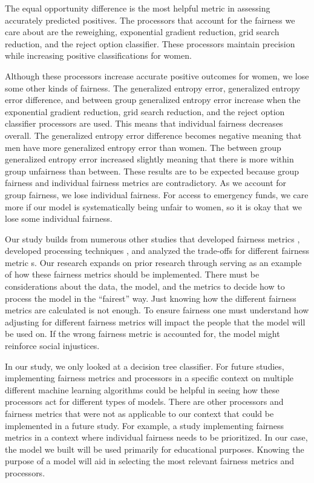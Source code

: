 \documentclass[water,article,submit,moreauthors,pdftex]{mdpi}
\begin{document}
The equal opportunity difference is the most helpful metric in assessing
accurately predicted positives. The processors that account for the
fairness we care about are the reweighing, exponential gradient
reduction, grid search reduction, and the reject option classifier.
These processors maintain precision while increasing positive
classifications for women.

Although these processors increase accurate positive outcomes for women,
we lose some other kinds of fairness. The generalized entropy error,
generalized entropy error difference, and between group generalized
entropy error increase when the exponential gradient reduction, grid
search reduction, and the reject option classifier processors are used.
This means that individual fairness decreases overall. The generalized
entropy error difference becomes negative meaning that men have more
generalized entropy error than women. The between group generalized
entropy error increased slightly meaning that there is more within group
unfairness than between. These results are to be expected because group
fairness and individual fairness metrics are contradictory. As we
account for group fairness, we lose individual fairness. For access to
emergency funds, we care more if our model is systematically being
unfair to women, so it is okay that we lose some individual fairness.

Our study builds from numerous other studies that developed fairness
metrics \citep{speicher2018unified, wachter2021fairness}, developed
processing techniques
\citep{agarwal2018reductions, kamiran2012data, agarwal2019fair, pleiss2017fairness},
and analyzed the trade-offs for different fairness metric
s\citep{speicher2018unified}. Our research expands on prior research
through serving as an example of how these fairness metrics should be
implemented. There must be considerations about the data, the model, and
the metrics to decide how to process the model in the ``fairest'' way.
Just knowing how the different fairness metrics are calculated is not
enough. To ensure fairness one must understand how adjusting for
different fairness metrics will impact the people that the model will be
used on. If the wrong fairness metric is accounted for, the model might
reinforce social injustices.

In our study, we only looked at a decision tree classifier. For future
studies, implementing fairness metrics and processors in a specific
context on multiple different machine learning algorithms could be
helpful in seeing how these processors act for different types of
models. There are other processors and fairness metrics that were not as
applicable to our context that could be implemented in a future study.
For example, a study implementing fairness metrics in a context where
individual fairness needs to be prioritized. In our case, the model we
built will be used primarily for educational purposes. Knowing the
purpose of a model will aid in selecting the most relevant fairness
metrics and processors.
\end{document}
